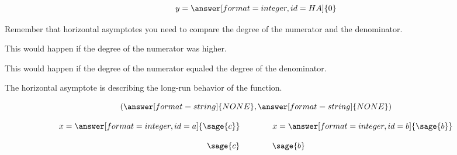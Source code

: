{\begin{problem}
\begin{problem}
\begin{problem}
\[y=\answer[format=integer,id=HA]{0}\]

\begin{feedback}[attempt]
Remember that horizontal asymptotes you need to compare the degree of the numerator and the denominator.
\end{feedback}

\begin{feedback}[HA>1]
This would happen if the degree of the numerator was higher.
\end{feedback}

\begin{feedback}[HA=1]
This would happen if the degree of the numerator equaled the degree of the denominator.
\end{feedback}

\begin{feedback}[correct]
The horizontal asymptote is describing the long-run behavior of the function.
\end{feedback}


\end{problem}

\[(\answer[format=string]{NONE}, \answer[format=string]{NONE})\]

\end{problem}

  \begin{validator}[a^2+b^2==$\sage{square}$]
\[x=\answer[format=integer,id=a]{\sage{c}}\qquad\qquad x=\answer[format=integer,id=b]{\sage{b}}\]
  \end{validator}

\[\sage{c}  \qquad\qquad  \sage{b}\]

\end{problem}}%

